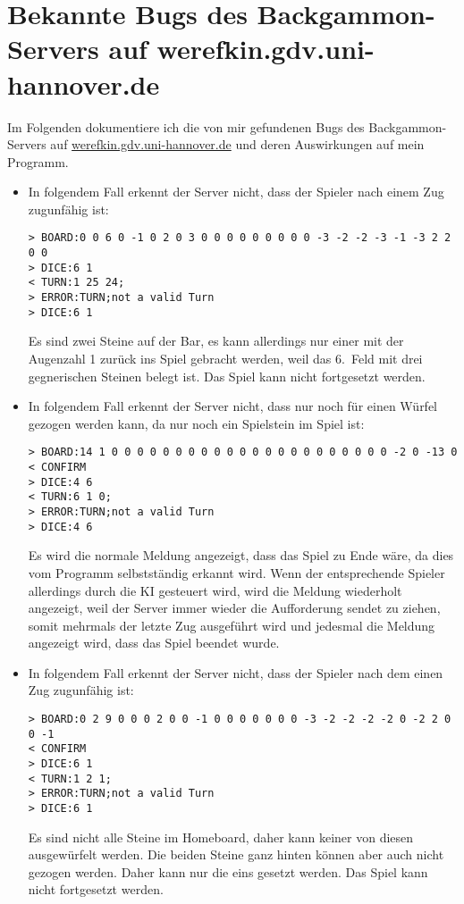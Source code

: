 
\chapter{Bekannte Bugs des Backgammon-Servers auf werefkin.gdv.uni-hannover.de} \label{sec:serverbugs}
Im Folgenden dokumentiere ich die von mir gefundenen Bugs des Backgammon-Servers auf \url{werefkin.gdv.uni-hannover.de} und deren Auswirkungen auf mein Programm.
\begin{itemize}

\item {} In folgendem Fall erkennt der Server nicht, dass der Spieler nach einem Zug zugunfähig ist:
\begin{lstlisting}
> BOARD:0 0 6 0 -1 0 2 0 3 0 0 0 0 0 0 0 0 0 -3 -2 -2 -3 -1 -3 2 2 0 0
> DICE:6 1
< TURN:1 25 24;
> ERROR:TURN;not a valid Turn
> DICE:6 1
\end{lstlisting}
Es sind zwei Steine auf der Bar, es kann allerdings nur einer mit der Augenzahl 1 zurück ins Spiel gebracht werden, weil das 6.\ Feld mit drei gegnerischen Steinen belegt ist.
 Das Spiel kann nicht fortgesetzt werden.

\item {} In folgendem Fall erkennt der Server nicht, dass nur noch für einen Würfel gezogen werden kann, da nur noch ein Spielstein im Spiel ist:
\begin{lstlisting}
> BOARD:14 1 0 0 0 0 0 0 0 0 0 0 0 0 0 0 0 0 0 0 0 0 0 0 -2 0 -13 0
< CONFIRM
> DICE:4 6
< TURN:6 1 0;
> ERROR:TURN;not a valid Turn
> DICE:4 6
\end{lstlisting}
 Es wird die normale Meldung angezeigt, dass das Spiel zu Ende wäre, da dies vom Programm selbstständig erkannt wird. Wenn der entsprechende Spieler allerdings durch die KI gesteuert wird, wird die Meldung wiederholt angezeigt, weil der Server immer wieder die Aufforderung sendet zu ziehen, somit mehrmals der letzte Zug ausgeführt wird und jedesmal die Meldung angezeigt wird, dass das Spiel beendet wurde.

\item {} In folgendem Fall erkennt der Server nicht, dass der Spieler nach dem einen Zug zugunfähig ist:
\begin{lstlisting}
> BOARD:0 2 9 0 0 0 2 0 0 -1 0 0 0 0 0 0 0 -3 -2 -2 -2 -2 0 -2 2 0 0 -1
< CONFIRM
> DICE:6 1
< TURN:1 2 1;
> ERROR:TURN;not a valid Turn
> DICE:6 1
\end{lstlisting}
Es sind nicht alle Steine im Homeboard, daher kann keiner von diesen ausgewürfelt werden. Die beiden Steine ganz hinten können aber auch nicht gezogen werden. Daher kann nur die eins gesetzt werden.
 Das Spiel kann nicht fortgesetzt werden.


\end{itemize}
